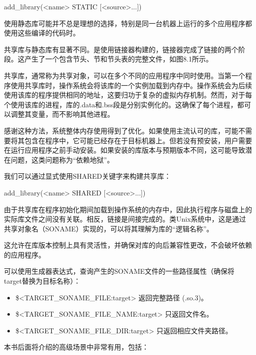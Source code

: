 \begin{shell}
add_library(<name> STATIC [<source>...])
\end{shell}

使用静态库可能并不总是理想的选择，特别是同一台机器上运行的多个应用程序都使用这些编译的代码时。


共享库与静态库有显著不同。是使用链接器构建的，链接器完成了链接的两个阶段。这产生了一个包含节头、节和节头表的完整文件，如图8.1所示。

共享库，通常称为共享对象，可以在多个不同的应用程序中同时使用。当第一个程序使用共享库时，操作系统会将该库的一个实例加载到内存中。操作系统会为后续使用该库的程序提供相同的地址，这要归功于复杂的虚拟内存机制。然而，对于每个使用该库的进程，库的.data和.bss段是分别实例化的。这确保了每个进程，都可以调整其变量，而不影响其他进程。

感谢这种方法，系统整体内存使用得到了优化。如果使用主流认可的库，可能不需要将其包含在程序中，它可能已经存在于目标机器上。但若没有预安装，用户需要在运行应用程序之前手动安装。如果安装的库版本与预期版本不同，这可能导致潜在问题，这类问题称为“依赖地狱”。

我们可以通过显式使用SHARED关键字来构建共享库：

\begin{shell}
add_library(<name> SHARED [<source>...])
\end{shell}

由于共享库在程序初始化期间加载到操作系统的内存中，因此执行程序与磁盘上的实际库文件之间没有关联。相反，链接是间接完成的。类Unix系统中，这是通过共享对象名（SONAME）实现的，可以将其理解为库的“逻辑名称”。

这允许在库版本控制上具有灵活性，并确保对库的向后兼容性更改，不会破坏依赖的应用程序。

可以使用生成器表达式，查询产生的SONAME文件的一些路径属性（确保将target替换为目标名称）：

\begin{itemize}
\item
\$<TARGET\_SONAME\_FILE:target> 返回完整路径 (.so.3)。

\item
\$<TARGET\_SONAME\_FILE\_NAME:target> 只返回文件名。

\item
\$<TARGET\_SONAME\_FILE\_DIR:target> 只返回相应文件夹路径。
\end{itemize}

本书后面将介绍的高级场景中非常有用，包括：

